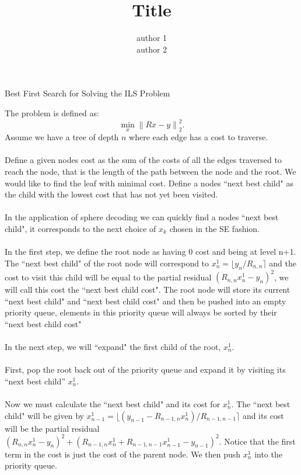 \documentclass[11pt]{article}	%
\author{author 1\\ author 2}
\title{Title}
\numberwithin{algorithm}{section}
\begin{document}

\begin{center}\begin{large}Best First Search for Solving the ILS Problem\end{large}\end{center}
The problem is defined as:
\begin{equation*}
\min_{x}\left \| Rx - y \right \|^2_2.
\end{equation*}
Assume we have a tree of depth $n$ where each edge has a cost to traverse.\\\\
Define a given nodes cost as the sum of the costs of all the edges traversed to reach the node, that is the length of the path between the node and the root. We would like to find the leaf with minimal cost. Define a nodes ``next best child" as the child with the lowest cost that has not yet been visited.\\\\
In the application of sphere decoding we can quickly find a nodes ``next best child", it corresponds to the next choice of $x_k$ chosen in the SE fashion.\\\\
In the first step, we define the root node as having 0 cost and being at level n+1. The ``next best child" of the root node will correspond to $x_n^1 = \lfloor y_n/R_{n,n} \rceil$ and the cost to visit this child will be equal to the partial residual $(R_{n,n}x_n^1 - y_n)^2$, we will call this cost the ``next best child cost". The root node will store its current ``next best child" and ``next best child cost" and then be pushed into an empty priority queue, elements in this priority queue will always be sorted by their ``next best child cost"\\\\
In the next step, we will ``expand" the first child of the root, $x_n^1$.\\\\
First, pop the root back out of the priority queue and expand it by visiting its ``next best child'' $x_n^1$.\\\\
Now we must calculate the ``next best child" and its cost for $x_n^1$. The ``next best child" will be given by $x_{n-1}^1 = \lfloor (y_{n-1} - R_{n-1,n}x_n^1)/R_{n-1,n-1} \rceil$ and its cost will be the partial residual $(R_{n,n}x_n^1 - y_n)^2 + (R_{n-1,n}x_n^1 + R_{n-1,n-1}x_{n-1}^1 - y_{n-1})^2$. Notice that the first term in the cost is just the cost of the parent node. We then push $x_n^1$ into the priority queue.\\\\
\end{document}
